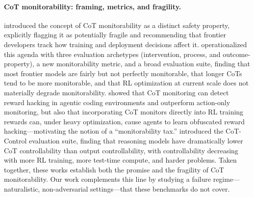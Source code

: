 \documentclass{article}
\begin{document}
\paragraph{CoT monitorability: framing, metrics, and fragility.}
\citet{korbak2025fragile} introduced the concept of CoT monitorability as a distinct safety property, explicitly flagging it as potentially fragile and recommending that frontier developers track how training and deployment decisions affect it. \citet{guan2025monitoring} operationalized this agenda with three evaluation archetypes (intervention, process, and outcome-property), a new monitorability metric, and a broad evaluation suite, finding that most frontier models are fairly but not perfectly monitorable, that longer CoTs tend to be more monitorable, and that RL optimization at current scale does not materially degrade monitorability. \citet{baker2025monitoring} showed that CoT monitoring can detect reward hacking in agentic coding environments and outperform action-only monitoring, but also that incorporating CoT monitors directly into RL training rewards can, under heavy optimization, cause agents to learn obfuscated reward hacking---motivating the notion of a ``monitorability tax.'' \citet{chen2026controllability} introduced the CoT-Control evaluation suite, finding that reasoning models have dramatically lower CoT controllability than output controllability, with controllability decreasing with more RL training, more test-time compute, and harder problems. Taken together, these works establish both the promise and the fragility of CoT monitorability. Our work complements this line by studying a failure regime---naturalistic, non-adversarial settings---that these benchmarks do not cover.
\end{document}
